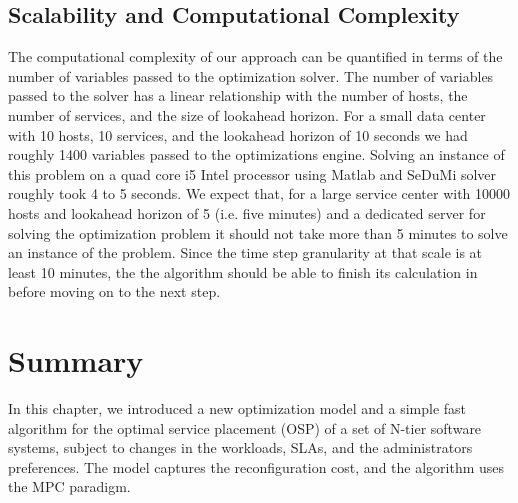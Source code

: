 
\subsection{Scalability and Computational Complexity} 
  The computational complexity of our approach can be quantified in terms of the number of variables passed to the optimization solver. The number of variables passed to the solver has a linear relationship with the number of hosts, the number of services, and the size of lookahead horizon. For a small data center with 10 hosts, 10 services, and the lookahead horizon of 10 seconds we had roughly 1400 variables passed to the optimizations engine. Solving an instance of this problem on a quad core i5 Intel processor using Matlab and SeDuMi solver roughly took 4 to 5 seconds. 
We expect that, for a large service center with 10000 hosts and lookahead horizon of 5 (i.e. five minutes) and a dedicated server for solving the optimization problem it should not take more than 5 minutes to solve an instance of the problem. Since the time step granularity at that scale is at least 10 minutes, the the algorithm should be able to finish its calculation in before moving on to the next step. 


\section{Summary}  
	\label{sec:conclusion-future-work}
In this chapter, we introduced a new optimization model and a simple fast algorithm for the optimal service placement (OSP) of a set of N-tier software systems, subject to changes in the workloads, SLAs, and the administrators preferences. The model captures the reconfiguration cost, and the algorithm uses the MPC paradigm. 
	
